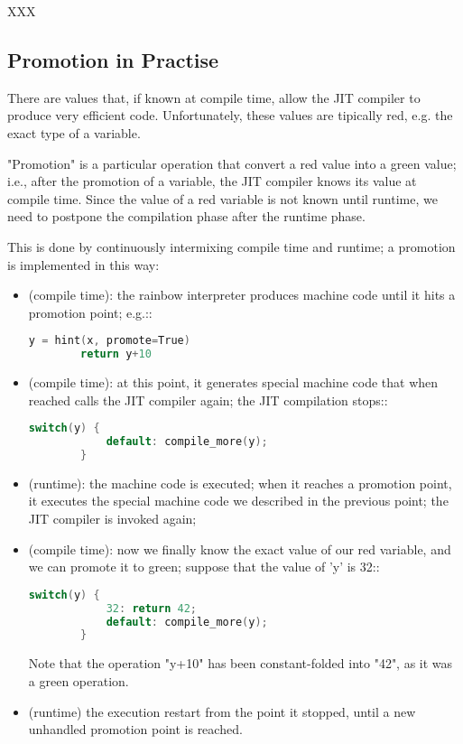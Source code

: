 XXX

\subsection{Promotion in Practise}

There are values that, if known at compile time, allow the JIT compiler to
produce very efficient code.  Unfortunately, these values are tipically red,
e.g. the exact type of a variable.

"Promotion" is a particular operation that convert a red value into a green
value; i.e., after the promotion of a variable, the JIT compiler knows its
value at compile time. Since the value of a red variable is not known until
runtime, we need to postpone the compilation phase after the runtime phase.

This is done by continuously intermixing compile time and runtime; a promotion
is implemented in this way:

\begin{itemize}
  \item (compile time): the rainbow interpreter produces machine code until it
    hits a promotion point; e.g.::

    \begin{lstlisting}[language=C]
        y = hint(x, promote=True)
        return y+10
    \end{lstlisting}

  \item (compile time): at this point, it generates special machine code that when
    reached calls the JIT compiler again; the JIT compilation stops::

    \begin{lstlisting}[language=C]
        switch(y) {
            default: compile_more(y);
        }
    \end{lstlisting}

  \item (runtime): the machine code is executed; when it reaches a promotion
    point, it executes the special machine code we described in the previous
    point; the JIT compiler is invoked again;

  \item (compile time): now we finally know the exact value of our red variable,
    and we can promote it to green; suppose that the value of 'y' is 32::

    \begin{lstlisting}[language=C]
        switch(y) {
            32: return 42;
            default: compile_more(y);
        }
    \end{lstlisting}

    Note that the operation "y+10" has been constant-folded into "42", as it
    was a green operation.

  \item (runtime) the execution restart from the point it stopped, until a new
    unhandled promotion point is reached.
\end{itemize}

